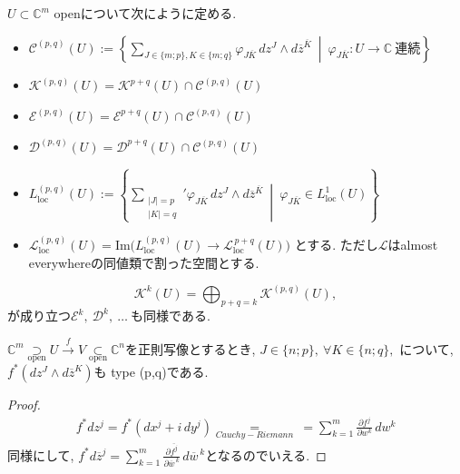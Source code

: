 \begin{tcolorbox}[mybox]
\begin{defn}
\(U \subset \mathbb{C}^m\) openについて次にように定める.
\begin{itemize}
\item 
$\mathcal{C}^{(p,q)}(U)
:=
\left\{
\sum_{J\in \{m;p\},  K\in \{m;q\}}
\varphi_{J\overline{K}}\, dz^J\wedge d\overline{z}^{\overline{K}}
\ \middle|\
\varphi_{J\overline{K}} : U \to \mathbb{C}\ \text{連続}
\right\}$
\item $\mathcal{K}^{(p,q)}(U)=\mathcal{K}^{p+q}(U)\cap \mathcal{C}^{(p,q)}(U)$
\item $\mathcal{E}^{(p,q)}(U)=\mathcal{E}^{p+q}(U)\cap \mathcal{C}^{(p,q)}(U)$
\item $\mathcal{D}^{(p,q)}(U)=\mathcal{D}^{p+q}(U)\cap \mathcal{C}^{(p,q)}(U)$
\item 
$L^{(p,q)}_{\mathrm{loc}}(U):=
\left\{
\sum_{\substack{|J|=p\\|K|=q}}'
\varphi_{J\overline{K}}\,dz^J\wedge d\overline{z}^{\overline{K}}
\ \middle|\
\varphi_{J\overline{K}}\in L^1_{\mathrm{loc}}(U)
\right\}
$
\item 
$\mathcal{L}^{(p,q)}_{\mathrm{loc}}(U)
=
\mathrm{Im}\bigl(L^{(p,q)}_{\mathrm{loc}}(U)\to \mathcal{L}^{\,p+q}_{\mathrm{loc}}(U)\bigr)
$
とする. ただし$\mathcal{L}$はalmost everywhereの同値類で割った空間とする. 
\end{itemize}
\end{defn}
\end{tcolorbox}

\begin{rem}
\label{rem-M-4.3}
\[
\mathcal{K}^{k}(U)=\bigoplus_{p+q=k}\mathcal{K}^{(p,q)}(U),
\]
が成り立つ$\mathcal{E}^k,\ \mathcal{D}^k,\ \ldots\ $も同様である. 
\end{rem}

\begin{tcolorbox}[mybox]
\begin{lem}
\label{lem-M-4.4}
\(\mathbb{C}^m \underset{\text{open}}{\supset} U \xrightarrow{\,f\,} V 
 \underset{\text{open}}{\subset} \mathbb{C}^n\)を正則写像とするとき, 
 \( J\in \{n;p\},\ \forall K\in \{n;q\},\)
について, 
\(
f^{*}(dz^{J}\wedge d\overline{z}^{K}) 
\)も type (p,q)である. 
\end{lem}
\end{tcolorbox}

\begin{proof}
\begin{align*}
f^{*}dz^{j}=f^{*}(dx^{j}+i\,dy^{j}) \underset{Cauchy-Riemann}{=}\
=\sum_{k=1}^{m}\frac{\partial f^{j}}{\partial w^{k}}\,dw^{k}
\end{align*}
同様にして, 
$
f^{*}d\overline{z}^{j}=
\sum_{k=1}^{m}\frac{\partial \overline{f^{j}}}{\partial \overline{w}^{\,k}}\,d\overline{w}^{\,k}$となるのでいえる. 
\end{proof}

